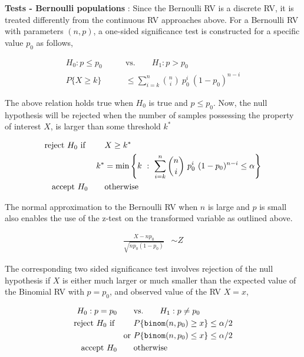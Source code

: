 \textbf{Tests - Bernoulli populations} : Since the Bernoulli RV is a discrete RV, it is treated differently from the continuous RV approaches above. For a Bernoulli RV with parameters $ (n, p) $, a one-sided significance test is constructed for a specific value $ p_0 $ as follows,

\begin{align}
	H_0 : p  \leq p_0 \qquad &\text{vs.} \qquad H_1 : p  > p_0 \\
	P \{X \geq k\} &\leq \sum\limits_{i=k}^{n} \binom{n}{i}\ p_0^i\ (1-p_0)^{n-i}
\end{align}

The above relation holds true when $ H_0 $ is true and $ p \leq p_0 $. Now, the null hypothesis will be rejected when the number of samples possessing the property of interest $ X $, is larger than some threshold $ k^* $

\begin{align}
	\text{reject $ H_0 $ if } \qquad & X \geq k^*  \nonumber \\
	k^* &= \min \left\{k\ :\ \sum\limits_{i=k}^{n} \binom{n}{i}\ p_0^i\ (1-p_0)^{n-i} \leq \alpha \right\} \nonumber \\
	\text{accept $ H_0 $} \qquad & \text{otherwise}
\end{align}

The normal approximation to the Bernoulli RV when $ n $ is large and $ p $ is small also enables the use of the z-test on the transformed variable as outlined above.

\begin{align}
	\frac{X - np_0}{\sqrt{np_0(1-p_0)}} &\sim Z \nonumber
\end{align}

The corresponding two sided significance test involves rejection of the null hypothesis if $ X $ is either much larger or much smaller than the expected value of the Binomial RV with $ p = p_0 $, and observed value of the RV $ X = x $,

\begin{align}
	H_0 : p  = p_0 \qquad &\text{vs.} \qquad H_1 : p  \neq p_0 \nonumber \\
	\text{reject $ H_0 $ if } \qquad & P\{\texttt{binom}(n, p_0) \geq x\} \leq \alpha/2  \nonumber \\
	\text{or }& P\{\texttt{binom}(n, p_0) \leq x\} \leq \alpha/2 \nonumber \\
	\text{accept $ H_0 $} \qquad & \text{otherwise}
\end{align}

